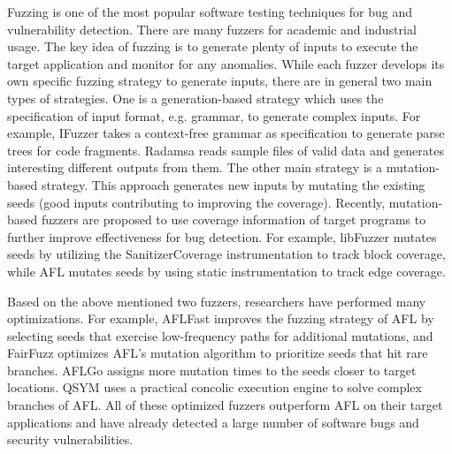 Fuzzing is one of the most popular software testing techniques for bug and vulnerability detection. There are many fuzzers for academic and industrial usage. The key idea of fuzzing is to generate plenty of inputs to execute the target application and monitor for any anomalies.
While each fuzzer develops its own specific fuzzing strategy to generate inputs,
there are in general two main types of strategies. One is a generation-based strategy which uses the specification of input format, e.g. grammar, to generate complex inputs. For example, IFuzzer \cite{ifuzzer} takes a context-free grammar as specification to generate parse trees for code fragments.
Radamsa \cite{helin2016radamsa} reads sample files of valid data and generates interesting different outputs from them.
The other main strategy is a mutation-based strategy. This approach generates new inputs by mutating the existing seeds (good inputs contributing to improving the coverage).
Recently, mutation-based fuzzers are proposed to use coverage information of target programs to further improve effectiveness for bug detection. For example, libFuzzer \cite{libFuzzer} mutates seeds by utilizing the SanitizerCoverage \cite{SanitizerCoverage} instrumentation to track block coverage, while AFL \cite{afl} mutates seeds by using static instrumentation to track edge coverage. 

Based on the above mentioned two fuzzers, researchers have performed many optimizations. For example, AFLFast \cite{aflfast} improves the fuzzing strategy of AFL by selecting seeds that exercise low-frequency paths for additional mutations, and FairFuzz \cite{FairFuzz} optimizes AFL's mutation algorithm to prioritize seeds that hit rare branches. AFLGo \cite{aflgo} assigns more mutation times to the seeds closer to target locations. QSYM \cite{qsym} uses a practical concolic execution engine to solve complex branches of AFL.
All of these optimized fuzzers outperform AFL on their target applications and have already detected a large number of software bugs and security vulnerabilities. 

